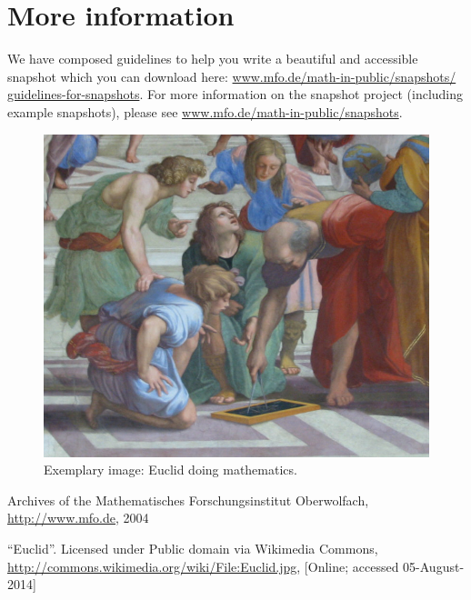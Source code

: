 \documentclass{snapshotmfo}
\begin{document}
\section{More information}
We have composed guidelines to help you write a beautiful and accessible snapshot which you can download here: \href{http://www.mfo.de/math-in-public/snapshots/guidelines-for-snapshots}{www.mfo.de/math-in-public/snapshots/ guidelines-for-snapshots}. For more information on the snapshot project (including example snapshots), please see \href{http://www.mfo.de/math-in-public/snapshots}{www.mfo.de/math-in-public/snapshots}.

\begin{figure}[h]
        \centering 
        \includegraphics[width= 0.33 \textwidth]{euclid.jpg}
        \caption{Exemplary image: Euclid doing mathematics.}
\label{fig:euclid}
\end{figure}
\clearpage

\begin{imagecredits}
  \item[Fig. \ref{fig:sample-image}] Archives of the Mathematisches Forschungsinstitut Oberwolfach,\\\url{http://www.mfo.de}, 2004
  \item[Fig. \ref{fig:euclid}] ``Euclid''. Licensed under Public domain via Wikimedia Commons,\\\url{http://commons.wikimedia.org/wiki/File:Euclid.jpg}, [Online; accessed 05-August-2014]
\end{imagecredits}



%
\end{document}
